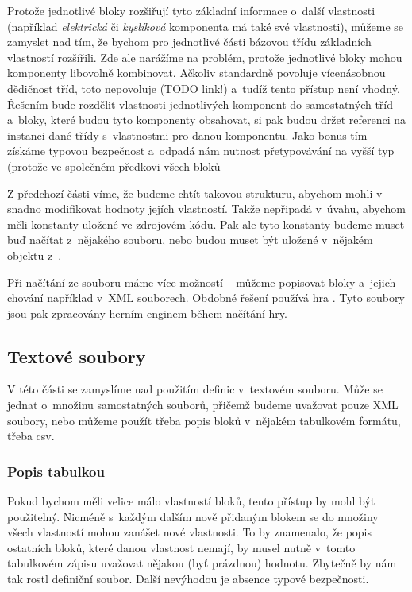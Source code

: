Protože jednotlivé bloky rozšiřují tyto základní informace o~další vlastnosti (například \textit{elektrická} či \textit{kyslíková} komponenta má také své vlastnosti), můžeme se zamyslet nad tím, že bychom pro jednotlivé části bázovou třídu základních vlastností rozšířili. Zde ale narážíme na problém, protože jednotlivé bloky mohou komponenty libovolně kombinovat. Ačkoliv \CPP{} standardně povoluje vícenásobnou dědičnost tříd, \UE{} toto nepovoluje (TODO link!) a~tudíž tento přístup není vhodný. Řešením bude rozdělit vlastnosti jednotlivých komponent do samostatných tříd a~bloky, které budou tyto komponenty obsahovat, si pak budou držet referenci na instanci dané třídy s~vlastnostmi pro danou komponentu. Jako bonus tím získáme typovou bezpečnost a~odpadá nám nutnost přetypovávání na vyšší typ (protože ve společném předkovi všech bloků

Z předchozí části víme, že budeme chtít takovou strukturu, abychom mohli v~\UE{} snadno modifikovat hodnoty jejích vlastností. Takže nepřipadá v~úvahu, abychom měli konstanty uložené ve zdrojovém kódu. Pak ale tyto konstanty budeme muset buď načítat z~nějakého souboru, nebo budou muset být uložené v~nějakém objektu z~\UE{}.

Při načítání ze souboru máme více možností -- můžeme popisovat bloky a~jejich chování například v~XML souborech. Obdobné řešení používá hra \ME{}. Tyto soubory jsou pak zpracovány herním enginem během načítání hry. 

\subsection{Textové soubory}
V této části se zamyslíme nad použitím definic v~textovém souboru. Může se jednat o~množinu samostatných souborů, přičemž budeme uvažovat pouze XML soubory, nebo můžeme použít třeba popis bloků v~nějakém tabulkovém formátu, třeba csv.

\subsubsection{Popis tabulkou}
Pokud bychom měli velice málo vlastností bloků, tento přístup by mohl být použitelný. Nicméně s~každým dalším nově přidaným blokem se do množiny všech vlastností mohou zanášet nové vlastnosti.  To by znamenalo, že popis ostatních bloků, které danou vlastnost nemají, by musel nutně v~tomto tabulkovém zápisu uvažovat nějakou (byť prázdnou) hodnotu. Zbytečně by nám tak rostl definiční soubor. Další nevýhodou je absence typové bezpečnosti. 

